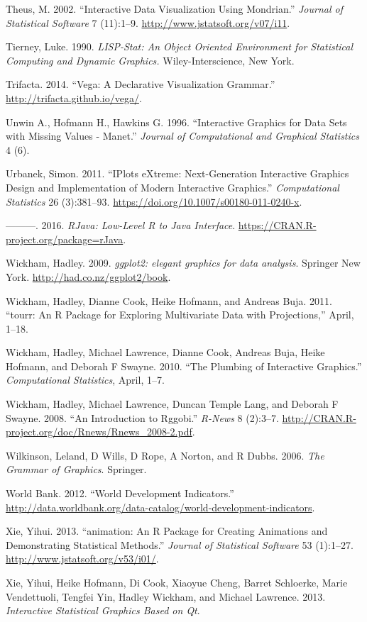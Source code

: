 \documentclass[12pt,]{article}
\theoremstyle{definition}
\theoremstyle{definition}
\theoremstyle{definition}
\theoremstyle{remark}
\begin{document}
\leavevmode\hypertarget{ref-mondrian}{}%
Theus, M. 2002. ``Interactive Data Visualization Using Mondrian.''
\emph{Journal of Statistical Software} 7 (11):1--9.
\url{http://www.jstatsoft.org/v07/i11}.

\leavevmode\hypertarget{ref-LISP-STAT}{}%
Tierney, Luke. 1990. \emph{LISP-Stat: An Object Oriented Environment for
Statistical Computing and Dynamic Graphics.} Wiley-Interscience, New
York.

\leavevmode\hypertarget{ref-vega}{}%
Trifacta. 2014. ``Vega: A Declarative Visualization Grammar.''
\url{http://trifacta.github.io/vega/}.

\leavevmode\hypertarget{ref-MANET}{}%
Unwin A., Hofmann H., Hawkins G. 1996. ``Interactive Graphics for Data
Sets with Missing Values - Manet.'' \emph{Journal of Computational and
Graphical Statistics} 4 (6).

\leavevmode\hypertarget{ref-Urbanek2011}{}%
Urbanek, Simon. 2011. ``IPlots eXtreme: Next-Generation Interactive
Graphics Design and Implementation of Modern Interactive Graphics.''
\emph{Computational Statistics} 26 (3):381--93.
\url{https://doi.org/10.1007/s00180-011-0240-x}.

\leavevmode\hypertarget{ref-rJava}{}%
---------. 2016. \emph{RJava: Low-Level R to Java Interface}.
\url{https://CRAN.R-project.org/package=rJava}.

\leavevmode\hypertarget{ref-ggplot2-book}{}%
Wickham, Hadley. 2009. \emph{ggplot2: elegant graphics for data
analysis}. Springer New York. \url{http://had.co.nz/ggplot2/book}.

\leavevmode\hypertarget{ref-tourr}{}%
Wickham, Hadley, Dianne Cook, Heike Hofmann, and Andreas Buja. 2011.
``tourr: An R Package for Exploring Multivariate Data with
Projections,'' April, 1--18.

\leavevmode\hypertarget{ref-plumbing}{}%
Wickham, Hadley, Michael Lawrence, Dianne Cook, Andreas Buja, Heike
Hofmann, and Deborah F Swayne. 2010. ``The Plumbing of Interactive
Graphics.'' \emph{Computational Statistics}, April, 1--7.

\leavevmode\hypertarget{ref-rggobi}{}%
Wickham, Hadley, Michael Lawrence, Duncan Temple Lang, and Deborah F
Swayne. 2008. ``An Introduction to Rggobi.'' \emph{R-News} 8 (2):3--7.
\url{http://CRAN.R-project.org/doc/Rnews/Rnews_2008-2.pdf}.

\leavevmode\hypertarget{ref-wilkinson}{}%
Wilkinson, Leland, D Wills, D Rope, A Norton, and R Dubbs. 2006.
\emph{The Grammar of Graphics}. Springer.

\leavevmode\hypertarget{ref-WorldBank}{}%
World Bank. 2012. ``World Development Indicators.''
\url{http://data.worldbank.org/data-catalog/world-development-indicators}.

\leavevmode\hypertarget{ref-animation}{}%
Xie, Yihui. 2013. ``animation: An R Package for Creating Animations and
Demonstrating Statistical Methods.'' \emph{Journal of Statistical
Software} 53 (1):1--27. \url{http://www.jstatsoft.org/v53/i01/}.

\leavevmode\hypertarget{ref-cranvas}{}%
Xie, Yihui, Heike Hofmann, Di Cook, Xiaoyue Cheng, Barret Schloerke,
Marie Vendettuoli, Tengfei Yin, Hadley Wickham, and Michael Lawrence.
2013. \emph{Interactive Statistical Graphics Based on Qt}.
\end{document}
